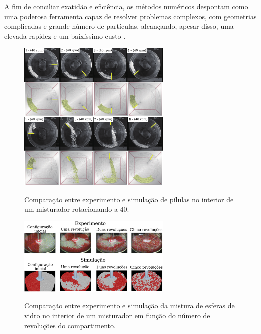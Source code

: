 A fim de conciliar exatidão e eficiência, os métodos numéricos despontam como uma poderosa ferramenta capaz de resolver problemas complexos, com geometrias complicadas e grande número de partículas, alcançando, apesar disso, uma elevada rapidez e um baixíssimo custo \cite{bib:maliska}.

\begin{figure}[h]
	\caption{Comparação entre experimento e simulação de pílulas no interior de um misturador rotacionando a \SI{40}{\rpm}.}
	\centering
		\includegraphics[width=0.65\textwidth]{images/introduction/pellet_flow_adapted.png}
	\label{fig:pellet_flow}
	\vspace{-0.5cm}
\end{figure}

\begin{figure}[h]
	\caption{Comparação entre experimento e simulação da mistura de esferas de vidro no interior de um misturador em função do número de revoluções do compartimento.}
	\centering
		\includegraphics[width=0.65\textwidth]{images/introduction/drug_production_adapted.png}
	\label{fig:drug_production}
	\vspace{-0.5cm}
\end{figure}


